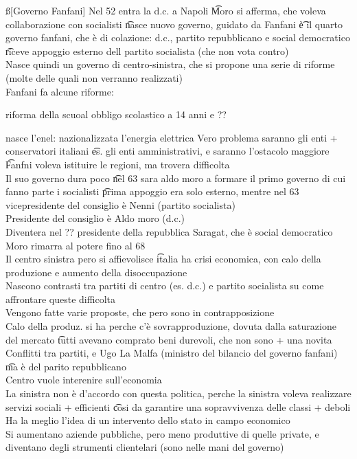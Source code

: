 \documentclass[12pt]{article}
\begin{document}
\ss[Governo Fanfani]
Nel 52 entra la d.c. a Napoli \t Moro si afferma, che voleva collaborazione con socialisti \t nasce nuovo governo, guidato da Fanfani \t è il quarto governo fanfani, che è di colazione: d.c., partito repubblicano e social democratico \t riceve appoggio esterno dell partito socialista (che non vota contro) \\
Nasce quindi un governo di centro-sinistra, che si propone una serie di riforme (molte delle quali non verranno realizzati) \\
Fanfani fa alcune riforme:
\bi
  \item riforma della scuoal obbligo scolastico a 14 anni e ??
  \item nasce l'enel: nazionalizzata l'energia elettrica
\ei
Vero problema saranno gli enti + conservatori italiani \t es. gli enti amministrativi, e saranno l'ostacolo maggiore \t Fanfni voleva istituire le regioni, ma trovera difficolta \\
Il suo governo dura poco \t nel 63 sara aldo moro a formare il primo governo di cui fanno parte i socialisti \t prima appoggio era solo esterno, mentre nel 63 vicepresidente del consiglio è Nenni (partito socialista) \\
Presidente del consiglio è Aldo moro (d.c.) \\
Diventera nel ?? presidente della repubblica Saragat, che è social democratico \\
Moro rimarra al potere fino al 68  \\
Il centro sinistra pero si affievolisce \t italia ha crisi economica, con calo della produzione e aumento della disoccupazione \\
Nascono contrasti tra partiti di centro (es. d.c.) e partito socialista su come affrontare queste difficolta \\
Vengono fatte varie proposte, che pero sono in contrapposizione \\
Calo della produz. si ha perche c'è sovrapproduzione, dovuta dalla saturazione del mercato \t tutti avevano comprato beni durevoli, che non sono + una novita \\
Conflitti tra partiti, e Ugo La Malfa (ministro del bilancio del governo fanfani) \t ma è del parito repubblicano \\
Centro vuole interenire sull'economia \\
La sinistra non è d'accordo con questa politica, perche la sinistra voleva realizzare servizi sociali + efficienti \t cosi da garantire una sopravvivenza delle classi + deboli \\
Ha la meglio l'idea di un intervento dello stato in campo economico \\
Si aumentano aziende pubbliche, pero meno produttive di quelle private, e diventano degli strumenti clientelari (sono nelle mani del governo)
\end{document}
